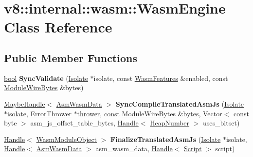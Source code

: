 \hypertarget{classv8_1_1internal_1_1wasm_1_1WasmEngine}{}\section{v8\+:\+:internal\+:\+:wasm\+:\+:Wasm\+Engine Class Reference}
\label{classv8_1_1internal_1_1wasm_1_1WasmEngine}
\subsection*{Public Member Functions}
\begin{DoxyCompactItemize}
\item 
\mbox{\label{classv8_1_1internal_1_1wasm_1_1WasmEngine_aaf88e443756927e9a1bde00d2e78a196}} 
\mbox{\hyperlink{classbool}{bool}} {\bfseries Sync\+Validate} (\mbox{\hyperlink{classv8_1_1internal_1_1Isolate}{Isolate}} $\ast$isolate, const \mbox{\hyperlink{structv8_1_1internal_1_1wasm_1_1WasmFeatures}{Wasm\+Features}} \&enabled, const \mbox{\hyperlink{structv8_1_1internal_1_1wasm_1_1ModuleWireBytes}{Module\+Wire\+Bytes}} \&bytes)
\item 
\mbox{\label{classv8_1_1internal_1_1wasm_1_1WasmEngine_a842b15c32ff8d4f3ccffcbab32e21ce9}} 
\mbox{\hyperlink{classv8_1_1internal_1_1MaybeHandle}{Maybe\+Handle}}$<$ \mbox{\hyperlink{classv8_1_1internal_1_1AsmWasmData}{Asm\+Wasm\+Data}} $>$ {\bfseries Sync\+Compile\+Translated\+Asm\+Js} (\mbox{\hyperlink{classv8_1_1internal_1_1Isolate}{Isolate}} $\ast$isolate, \mbox{\hyperlink{classv8_1_1internal_1_1wasm_1_1ErrorThrower}{Error\+Thrower}} $\ast$thrower, const \mbox{\hyperlink{structv8_1_1internal_1_1wasm_1_1ModuleWireBytes}{Module\+Wire\+Bytes}} \&bytes, \mbox{\hyperlink{classv8_1_1internal_1_1Vector}{Vector}}$<$ const byte $>$ asm\+\_\+js\+\_\+offset\+\_\+table\+\_\+bytes, \mbox{\hyperlink{classv8_1_1internal_1_1Handle}{Handle}}$<$ \mbox{\hyperlink{classv8_1_1internal_1_1HeapNumber}{Heap\+Number}} $>$ uses\+\_\+bitset)
\item 
\mbox{\label{classv8_1_1internal_1_1wasm_1_1WasmEngine_a2f4b59db1fd3eec79204f0e3628f1074}} 
\mbox{\hyperlink{classv8_1_1internal_1_1Handle}{Handle}}$<$ \mbox{\hyperlink{classv8_1_1internal_1_1WasmModuleObject}{Wasm\+Module\+Object}} $>$ {\bfseries Finalize\+Translated\+Asm\+Js} (\mbox{\hyperlink{classv8_1_1internal_1_1Isolate}{Isolate}} $\ast$isolate, \mbox{\hyperlink{classv8_1_1internal_1_1Handle}{Handle}}$<$ \mbox{\hyperlink{classv8_1_1internal_1_1AsmWasmData}{Asm\+Wasm\+Data}} $>$ asm\+\_\+wasm\+\_\+data, \mbox{\hyperlink{classv8_1_1internal_1_1Handle}{Handle}}$<$ \mbox{\hyperlink{classv8_1_1internal_1_1Script}{Script}} $>$ script)

\end{DoxyCompactItemize}
